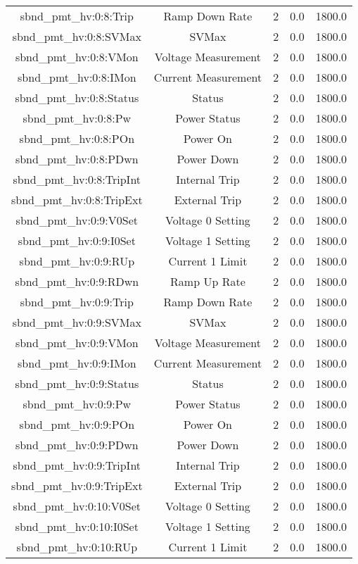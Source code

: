 \begin{table}[ptb]
\begin{tabular}{c | c c c c}
sbnd_pmt_hv:0:8:Trip & Ramp Down Rate & 2 & 0.0 & 1800.0\\ 
sbnd_pmt_hv:0:8:SVMax & SVMax & 2 & 0.0 & 1800.0\\ 
sbnd_pmt_hv:0:8:VMon & Voltage Measurement & 2 & 0.0 & 1800.0\\ 
sbnd_pmt_hv:0:8:IMon & Current Measurement & 2 & 0.0 & 1800.0\\ 
sbnd_pmt_hv:0:8:Status & Status & 2 & 0.0 & 1800.0\\ 
sbnd_pmt_hv:0:8:Pw & Power Status & 2 & 0.0 & 1800.0\\ 
sbnd_pmt_hv:0:8:POn & Power On & 2 & 0.0 & 1800.0\\ 
sbnd_pmt_hv:0:8:PDwn & Power Down & 2 & 0.0 & 1800.0\\ 
sbnd_pmt_hv:0:8:TripInt & Internal Trip & 2 & 0.0 & 1800.0\\ 
sbnd_pmt_hv:0:8:TripExt & External Trip & 2 & 0.0 & 1800.0\\ 
sbnd_pmt_hv:0:9:V0Set & Voltage 0 Setting & 2 & 0.0 & 1800.0\\ 
sbnd_pmt_hv:0:9:I0Set & Voltage 1 Setting & 2 & 0.0 & 1800.0\\ 
sbnd_pmt_hv:0:9:RUp & Current 1 Limit & 2 & 0.0 & 1800.0\\ 
sbnd_pmt_hv:0:9:RDwn & Ramp Up Rate & 2 & 0.0 & 1800.0\\ 
sbnd_pmt_hv:0:9:Trip & Ramp Down Rate & 2 & 0.0 & 1800.0\\ 
sbnd_pmt_hv:0:9:SVMax & SVMax & 2 & 0.0 & 1800.0\\ 
sbnd_pmt_hv:0:9:VMon & Voltage Measurement & 2 & 0.0 & 1800.0\\ 
sbnd_pmt_hv:0:9:IMon & Current Measurement & 2 & 0.0 & 1800.0\\ 
sbnd_pmt_hv:0:9:Status & Status & 2 & 0.0 & 1800.0\\ 
sbnd_pmt_hv:0:9:Pw & Power Status & 2 & 0.0 & 1800.0\\ 
sbnd_pmt_hv:0:9:POn & Power On & 2 & 0.0 & 1800.0\\ 
sbnd_pmt_hv:0:9:PDwn & Power Down & 2 & 0.0 & 1800.0\\ 
sbnd_pmt_hv:0:9:TripInt & Internal Trip & 2 & 0.0 & 1800.0\\ 
sbnd_pmt_hv:0:9:TripExt & External Trip & 2 & 0.0 & 1800.0\\ 
sbnd_pmt_hv:0:10:V0Set & Voltage 0 Setting & 2 & 0.0 & 1800.0\\ 
sbnd_pmt_hv:0:10:I0Set & Voltage 1 Setting & 2 & 0.0 & 1800.0\\ 
sbnd_pmt_hv:0:10:RUp & Current 1 Limit & 2 & 0.0 & 1800.0\\ 

\end{tabular}
\end{table}
